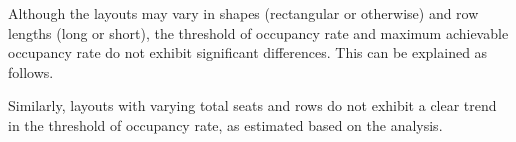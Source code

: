 Although the layouts may vary in shapes (rectangular or otherwise) and row lengths (long or short), the threshold of occupancy rate and maximum achievable occupancy rate do not exhibit significant differences. This can be explained as follows.

Similarly, layouts with varying total seats and rows do not exhibit a clear trend in the threshold of occupancy rate, as estimated based on the analysis.